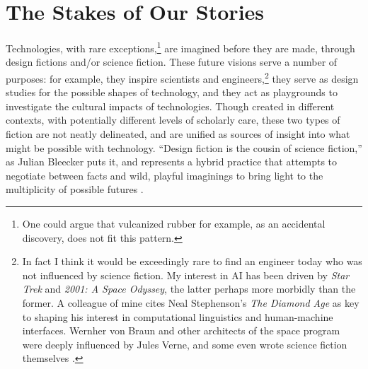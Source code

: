 \chapter{The Stakes of Our Stories}
\label{chap:2}













Technologies, with rare exceptions,\footnote{One could argue that
  vulcanized rubber for example, as an accidental discovery, does not
  fit this pattern.} are imagined before they are made, through design
fictions and/or science fiction. These future
visions serve a number of purposes: for example, they inspire scientists and
engineers,\footnote{In fact I think it would be exceedingly rare to
  find an engineer today who was not influenced by science fiction. My
  interest in AI has been driven by \emph{Star Trek} and \emph{2001: A
  Space Odyssey}, the latter perhaps more morbidly than the former. A
  colleague of mine cites Neal Stephenson's
  \emph{The Diamond Age} as key to shaping his interest in
  computational linguistics and human-machine interfaces. Wernher von
  Braun and other architects of the space program were deeply
  influenced by Jules Verne, and some even wrote science fiction
  themselves \cite[p. 2]{marketingMoon}.} they serve as design
studies for the possible shapes of technology, and they act as
playgrounds to investigate the cultural impacts of technologies.
Though created in different contexts, with potentially 
different levels of scholarly care, these two types of fiction are not
neatly delineated, and are unified as sources of insight into what
might be possible with technology. ``Design fiction is the cousin of
science fiction,'' as Julian Bleecker puts it, and represents a hybrid
practice that attempts to negotiate between facts and wild, playful
imaginings to bring light to the multiplicity of possible
futures \cite[p. 8]{bleecker}. 

